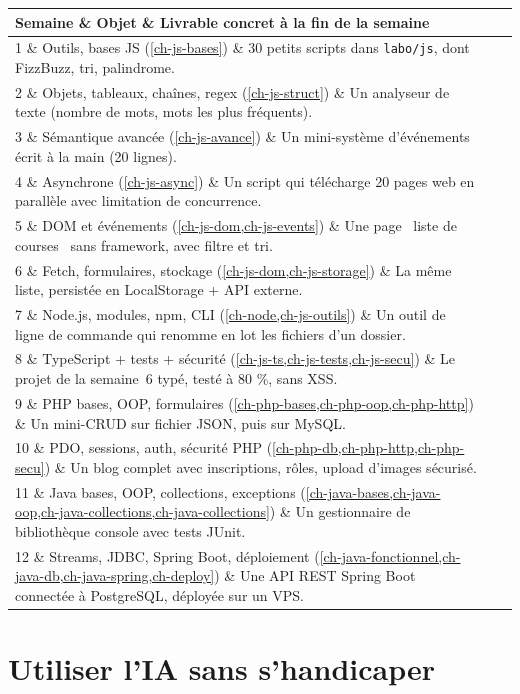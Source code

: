 \documentclass[12pt,a4paper,twoside,openright]{book}
\makeatletter
\newenvironment{tabz}[1]{\rowcolors{2}{white}{tralight}%
  \small\setlength{\tabcolsep}{5pt}\setlength{\LTpre}{3pt}\setlength{\LTpost}{3pt}%
  \begin{longtable}{@{}#1@{}}\toprule}
  {\bottomrule\end{longtable}\normalfont\setlength{\tabcolsep}{6pt}}
\newcommand{\thd}[1]{\textbf{\color{white}#1}}
\newcommand{\headrow}{\rowcolor{theadbg}}
\makeatother
\begin{document}
\begin{tabz}{llX}
  \headrow \thd{Semaine} \& \thd{Objet} \& \thd{Livrable concret \`a la fin de la semaine} \\
  \midrule
  1 \& Outils, bases JS (\cref{ch-js-bases}) \& 30 petits scripts dans \verb|labo/js|, dont FizzBuzz, tri, palindrome. \\
  2 \& Objets, tableaux, cha\^ines, regex (\cref{ch-js-struct}) \& Un analyseur de texte (nombre de mots, mots les plus fr\'equents). \\
  3 \& S\'emantique avanc\'ee (\cref{ch-js-avance}) \& Un mini-syst\`eme d'\'ev\'enements \'ecrit \`a la main (20 lignes). \\
  4 \& Asynchrone (\cref{ch-js-async}) \& Un script qui t\'el\'echarge 20 pages web en parall\`ele avec limitation de concurrence. \\
  5 \& DOM et \'ev\'enements (\cref{ch-js-dom,ch-js-events}) \& Une page \og ~liste de courses~ \fg{} sans framework, avec filtre et tri. \\
  6 \& Fetch, formulaires, stockage (\cref{ch-js-dom,ch-js-storage}) \& La m\^eme liste, persist\'ee en LocalStorage + API externe. \\
  7 \& Node.js, modules, npm, CLI (\cref{ch-node,ch-js-outils}) \& Un outil de ligne de commande qui renomme en lot les fichiers d'un dossier. \\
  8 \& TypeScript + tests + s\'ecurit\'e (\cref{ch-js-ts,ch-js-tests,ch-js-secu}) \& Le projet de la semaine~6 typ\'e, test\'e \`a 80 \%, sans XSS. \\
  9 \& PHP bases, OOP, formulaires (\cref{ch-php-bases,ch-php-oop,ch-php-http}) \& Un mini-CRUD sur fichier JSON, puis sur MySQL. \\
  10 \& PDO, sessions, auth, s\'ecurit\'e PHP (\cref{ch-php-db,ch-php-http,ch-php-secu}) \& Un blog complet avec inscriptions, r\^oles, upload d'images s\'ecuris\'e. \\
  11 \& Java bases, OOP, collections, exceptions (\cref{ch-java-bases,ch-java-oop,ch-java-collections,ch-java-collections}) \& Un gestionnaire de biblioth\`eque console avec tests JUnit. \\
  12 \& Streams, JDBC, Spring Boot, d\'eploiement (\cref{ch-java-fonctionnel,ch-java-db,ch-java-spring,ch-deploy}) \& Une API REST Spring Boot connect\'ee \`a PostgreSQL, d\'eploy\'ee sur un VPS. \\
\end{tabz}

\section{Utiliser l'IA sans s'handicaper}
\end{document}
